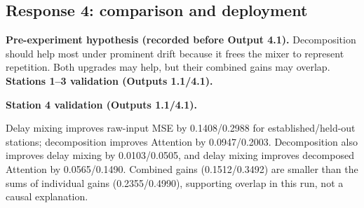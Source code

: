 \documentclass[10pt]{article}
\begin{document}
\subsection*{Response 4: comparison and deployment}
\textbf{Pre-experiment hypothesis (recorded before Output 4.1).} Decomposition should help most under prominent drift because it frees the mixer to represent repetition. Both upgrades may help, but their combined gains may overlap.
\textbf{Stations 1--3 validation (Outputs 1.1/4.1).}
\begin{center}\end{center}
\textbf{Station 4 validation (Outputs 1.1/4.1).}
\begin{center}\end{center}
Delay mixing improves raw-input MSE by 0.1408/0.2988 for established/held-out stations; decomposition improves Attention by 0.0947/0.2003. Decomposition also improves delay mixing by 0.0103/0.0505, and delay mixing improves decomposed Attention by 0.0565/0.1490. Combined gains (0.1512/0.3492) are smaller than the sums of individual gains (0.2355/0.4990), supporting overlap in this run, not a causal explanation.
\end{document}
